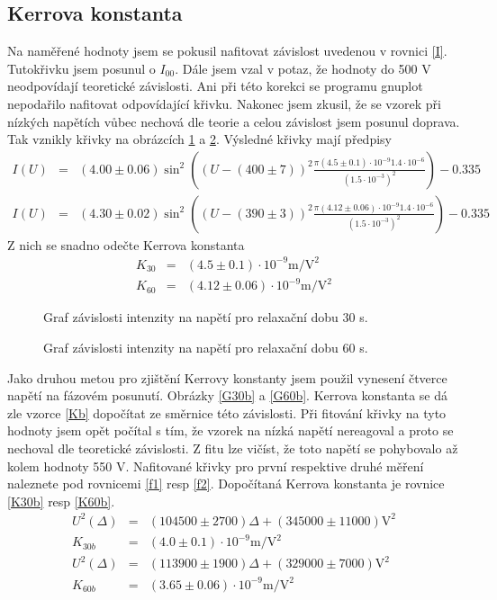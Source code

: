 \documentclass[a4paper,12pt]{article}
\begin{document}
\subsection{Kerrova konstanta}
Na naměřené hodnoty jsem se pokusil nafitovat závislost uvedenou v rovnici \ref{I}. Tutokřivku jsem posunul o $I_{00}$. Dále jsem vzal v potaz, že 
hodnoty do 500 V neodpovídají teoretické závislosti. Ani při této korekci se programu gnuplot nepodařilo nafitovat odpovídající křivku. Nakonec jsem zkusil, 
že se vzorek při nízkých napětích vůbec nechová dle teorie a celou závislost jsem posunul doprava. Tak vznikly křivky na obrázcích \ref{G30} a \ref{G60}. 
Výsledné křivky mají předpisy
\begin{eqnarray}
I(U)&=&(4.00\pm0.06)\sin^2\left((U-(400\pm7))^2\frac{\pi (4.5\pm0.1)\cdot 10^{-9} 1.4\cdot 10^{-6}}{(1.5\cdot10^{-3})^2} \right)-0.335 \\
I(U)&=&(4.30\pm0.02)\sin^2\left((U-(390\pm3))^2\frac{\pi (4.12\pm0.06)\cdot 10^{-9} 1.4\cdot 10^{-6}}{(1.5\cdot10^{-3})^2} \right)-0.335
\end{eqnarray}
Z nich se snadno odečte Kerrova konstanta
\begin{eqnarray}
K_{30}&=&(4.5\pm0.1)\cdot 10^{-9} \mbox{m}/\mbox{V}^2\\
K_{60}&=&(4.12\pm0.06)\cdot 10^{-9} \mbox{m}/\mbox{V}^2
\end{eqnarray}

\begin{figure}
\begin{center}

\end{center}
\caption{Graf závislosti intenzity na napětí pro relaxační dobu 30 s.}
\label{G30}
\end{figure}

\begin{figure}
\begin{center}

\end{center}
\caption{Graf závislosti intenzity na napětí pro relaxační dobu 60 s.}
\label{G60}
\end{figure}

Jako druhou metou pro zjištění Kerrovy konstanty jsem použil vynesení čtverce napětí na fázovém posunutí. Obrázky \ref{G30b} a \ref{G60b}. Kerrova konstanta se dá zle vzorce \ref{Kb} dopočítat ze směrnice 
této závislosti. Při fitování křivky na tyto hodnoty jsem opět počítal s tím, že vzorek na nízká napětí nereagoval a proto se nechoval dle teoretické závislosti. 
Z fitu lze vičíst, že toto napětí se pohybovalo až kolem hodnoty 550 V. Nafitované křivky pro první respektive druhé měření naleznete pod rovnicemi \ref{f1} resp \ref{f2}. 
Dopočítaná Kerrova konstanta je rovnice \ref{K30b} resp \ref{K60b}.
\begin{eqnarray}
\label{f1}
U^2(\Delta)&=&(104500\pm 2700)\Delta+(345000\pm 11000) \mbox{V}^2 \\
\label{K30b}
K_{30b}&=&(4.0\pm0.1)\cdot 10^{-9}\mbox{m}/\mbox{V}^2 \\
\label{f2}
U^2(\Delta)&=&(113900\pm 1900)\Delta+(329000\pm 7000) \mbox{V}^2 \\
\label{K60b}
K_{60b}&=&(3.65\pm0.06)\cdot 10^{-9}\mbox{m}/\mbox{V}^2 
\end{eqnarray}
\end{document}
